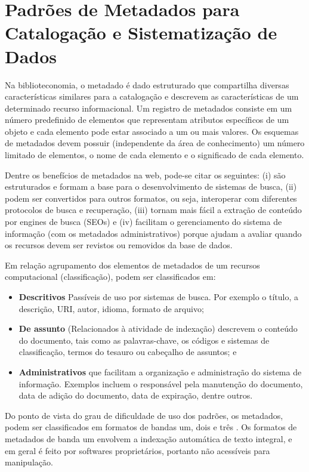 \section{Padrões de Metadados para Catalogação e Sistematização de Dados}
\label{sec:padraometadado}

Na biblioteconomia, o metadado é dado estruturado que compartilha diversas características similares para a catalogação e descrevem as características de um determinado recurso informacional. Um registro de metadados consiste em um número predefinido de elementos que representam atributos específicos de um objeto e cada elemento pode estar associado a um ou mais valores. Os esquemas de metadados devem possuir (independente da área de conhecimento) um número limitado de elementos, o nome de cada elemento e o significado de cada elemento.

Dentre os benefícios de metadados na web, pode-se citar os seguintes: (i) são estruturados e formam a base para o desenvolvimento de sistemas de busca, (ii) podem ser convertidos para outros formatos, ou seja, interoperar com diferentes protocolos de busca e recuperação, (iii) tornam mais fácil a extração de conteúdo por engines de busca (SEOs) e (iv) facilitam o gerenciamento do sistema de informação (com os metadados administrativos) porque ajudam a avaliar quando os recursos devem ser revistos ou removidos da base de dados.

Em relação agrupamento dos elementos de metadados de um recursos computacional (classificação), podem ser classificados em:

\begin{itemize}
	\item \textbf{Descritivos} Passíveis de uso por sistemas de busca. Por exemplo o título, a descrição, URI, autor, idioma, formato de arquivo;
	\item \textbf{De assunto} (Relacionados à atividade de indexação) descrevem o conteúdo do documento, tais como as palavras-chave, os códigos e sistemas de classificação, termos do tesauro ou cabeçalho de assuntos; e
	\item \textbf{Administrativos} que facilitam a organização e administração do sistema de informação. Exemplos incluem o responsável pela manutenção do documento, data de adição do documento, data de expiração, dentre outros.
\end{itemize}

Do ponto de vista do grau de dificuldade de uso dos padrões, os metadados, podem ser classificados em formatos de bandas um, dois e três \cite{feitosa2006organizacao}. Os formatos de metadados de banda um envolvem a indexação automática de texto integral, e em geral é feito por softwares proprietários, portanto não acessíveis para manipulação.

